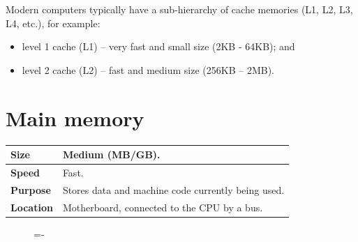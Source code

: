 \documentclass[a4paper]{systems-software}
\begin{document}
Modern computers typically have a sub-hierarchy of cache memories (L1, L2, L3, L4, etc.), for example:
\begin{itemize}
	\item level 1 cache (L1)	 -- very fast and small size (2KB - 64KB); and
	\item level 2 cache (L2)	 -- fast and medium size (256KB – 2MB).
\end{itemize}


\section*{Main memory}

\begin{longtabu} to \textwidth {| X[1,l] | X[6,l] |}
    \hline
    \textbf{Size} & Medium (MB/GB).
	\\ \hline
	\textbf{Speed} & Fast.
	\\ \hline
	\textbf{Purpose} & Stores data and machine code currently being used.
	\\ \hline
	\textbf{Location} & Motherboard, connected to the CPU by a bus.
	\\ \hline
\end{longtabu}

\begin{figure}[H]
  \lineskip=-\fboxrule
\end{figure}
\end{document}
